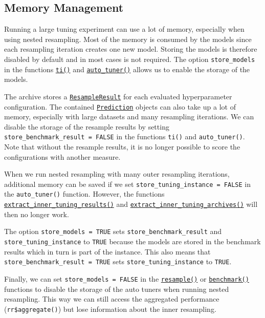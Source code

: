 \hypertarget{sec-memory-management}{%
\subsection{Memory Management}\label{sec-memory-management}}

Running a large tuning experiment can use a lot of memory, especially
when using nested resampling. Most of the memory is consumed by the
models since each resampling iteration creates one new model. Storing
the models is therefore disabled by default and in most cases is not
required. The option \texttt{store\_models} in the functions
\href{https://mlr3tuning.mlr-org.com/reference/ti.html}{\texttt{ti()}}
and
\href{https://mlr3tuning.mlr-org.com/reference/auto_tuner.html}{\texttt{auto\_tuner()}}
allows us to enable the storage of the models.

The archive stores a
\href{https://mlr3.mlr-org.com/reference/ResampleResult.html}{\texttt{ResampleResult}}
for each evaluated hyperparameter configuration. The contained
\href{https://mlr3.mlr-org.com/reference/Prediction.html}{\texttt{Prediction}}
objects can also take up a lot of memory, especially with large datasets
and many resampling iterations. We can disable the storage of the
resample results by setting \texttt{store\_benchmark\_result\ =\ FALSE}
in the functions \texttt{ti()} and \texttt{auto\_tuner()}. Note that
without the resample results, it is no longer possible to score the
configurations with another measure.

When we run nested resampling with many outer resampling iterations,
additional memory can be saved if we set
\texttt{store\_tuning\_instance\ =\ FALSE} in the \texttt{auto\_tuner()}
function. However, the functions
\href{https://mlr3tuning.mlr-org.com/reference/extract_inner_tuning_results.html}{\texttt{extract\_inner\_tuning\_results()}}
and
\href{https://mlr3tuning.mlr-org.com/reference/extract_inner_tuning_archives.html}{\texttt{extract\_inner\_tuning\_archives()}}
will then no longer work.

The option \texttt{store\_models\ =\ TRUE} sets
\texttt{store\_benchmark\_result} and \texttt{store\_tuning\_instance}
to \texttt{TRUE} because the models are stored in the benchmark results
which in turn is part of the instance. This also means that
\texttt{store\_benchmark\_result\ =\ TRUE} sets
\texttt{store\_tuning\_instance} to \texttt{TRUE}.

Finally, we can set \texttt{store\_models\ =\ FALSE} in the
\href{https://mlr3.mlr-org.com/reference/resample.html}{\texttt{resample()}}
or
\href{https://mlr3.mlr-org.com/reference/benchmark.html}{\texttt{benchmark()}}
functions to disable the storage of the auto tuners when running nested
resampling. This way we can still access the aggregated performance
(\texttt{rr\$aggregate()}) but lose information about the inner
resampling.


